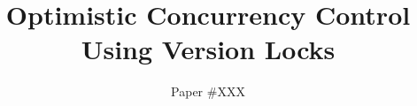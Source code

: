 \title{Optimistic Concurrency Control Using Version Locks}


\author{%
 \texorpdfstring{
 Paper \#XXX
 }{}
}


